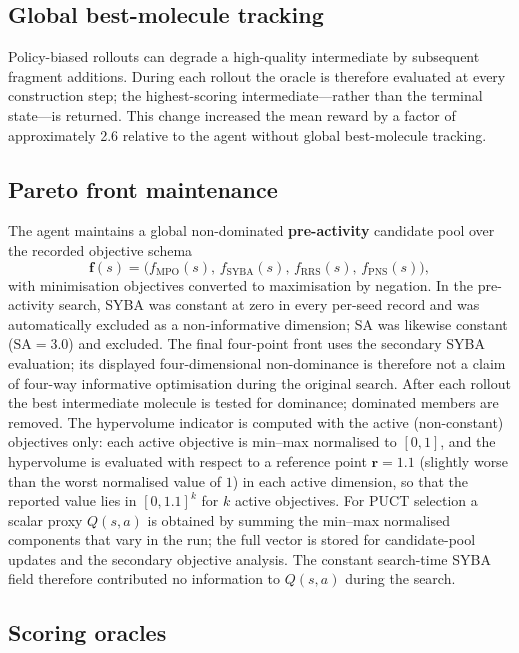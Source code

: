 \documentclass[10pt,a4paper]{article}
\begin{document}
\subsection{Global best-molecule tracking}
\label{sec:rollout_fix}

Policy-biased rollouts can degrade a high-quality intermediate by subsequent fragment additions. During each rollout the oracle is therefore evaluated at every construction step; the highest-scoring intermediate---rather than the terminal state---is returned. This change increased the mean reward by a factor of approximately \num{2.6} relative to the agent without global best-molecule tracking.

\subsection{Pareto front maintenance}
\label{sec:pareto}

The agent maintains a global non-dominated \textbf{pre-activity} candidate pool over the recorded objective schema
\[
\mathbf{f}(s)=\bigl(f_{\text{MPO}}(s),\,f_{\text{SYBA}}(s),\,f_{\text{RRS}}(s),\,f_{\text{PNS}}(s)\bigr),
\]
with minimisation objectives converted to maximisation by negation. In the pre-activity search, SYBA was constant at zero in every per-seed record and was automatically excluded as a non-informative dimension; SA was likewise constant ($\mathrm{SA}=\num{3.0}$) and excluded. The final four-point front uses the secondary SYBA evaluation; its displayed four-dimensional non-dominance is therefore not a claim of four-way informative optimisation during the original search. After each rollout the best intermediate molecule is tested for dominance; dominated members are removed. The hypervolume indicator is computed with the active (non-constant) objectives only: each active objective is min--max normalised to $[0,1]$, and the hypervolume is evaluated with respect to a reference point $\mathbf{r}=\num{1.1}$ (slightly worse than the worst normalised value of $1$) in each active dimension, so that the reported value lies in $[0,1.1]^{k}$ for $k$ active objectives. For PUCT selection a scalar proxy $Q(s,a)$ is obtained by summing the min--max normalised components that vary in the run; the full vector is stored for candidate-pool updates and the secondary objective analysis. The constant search-time SYBA field therefore contributed no information to $Q(s,a)$ during the search.

\subsection{Scoring oracles}
\label{sec:oracles}
\end{document}
